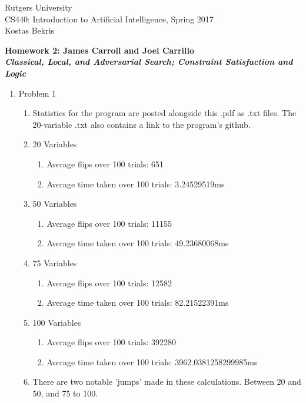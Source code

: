\documentclass[11pt]{article}
\begin{document}
\sloppy

\noindent Rutgers University\\
CS440: Introduction to Artificial Intelligence, Spring 2017\\
Kostas Bekris\\

\begin{center}
\LARGE{\textbf{Homework 2: James Carroll and Joel Carrillo}}\\
\large{\textbf{\emph{Classical, Local, and Adversarial Search; Constraint Satisfaction and Logic}}}
\end{center}

\vspace{.1in}

\begin{enumerate}

\item Problem 1
\begin{enumerate}
\item Statistics for the program are posted alongside this .pdf as .txt files. The 20-variable .txt also contains a link to the program's github.
\item 20 Variables
\begin{enumerate}
\item Average flips over 100 trials: 651
\item Average time taken over 100 trials: 3.24529519ms
\end{enumerate}
\item 50 Variables
\begin{enumerate}
\item Average flips over 100 trials: 11155
\item Average time taken over 100 trials: 49.23680068ms
\end{enumerate}
\item 75 Variables
\begin{enumerate}
\item Average flips over 100 trials: 12582
\item Average time taken over 100 trials: 82.21522391ms
\end{enumerate}
\item 100 Variables
\begin{enumerate}
\item Average flips over 100 trials: 392280
\item Average time taken over 100 trials: 3962.0381258299985ms
\end{enumerate}
\item There are two notable 'jumps' made in these calculations. Between 20 and 50, and 75 to 100.

\end{enumerate}
\end{enumerate}
\end{document}
